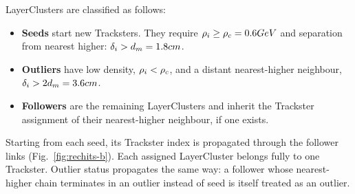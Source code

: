 LayerClusters are classified as follows:
\begin{itemize}
  \item \textbf{Seeds} start new Tracksters. They require
  $\rho_i\geq\rho_{c}=0.6 GeV$ and separation from nearest higher:
  $\delta_i>d_{m}=1.8 cm$.
  \item \textbf{Outliers} have low density, $\rho_i<\rho_{c}$, and a distant
  nearest-higher neighbour, $\delta_i>2d_{m}=3.6 cm$.
  \item \textbf{Followers} are the remaining LayerClusters and inherit the
  Trackster assignment of their nearest-higher neighbour, if one exists.
\end{itemize}

Starting from each seed, its Trackster index is propagated through the
follower links (Fig.~\ref{fig:rechits-b}). Each assigned LayerCluster belongs
fully to one Trackster.
Outlier status propagates the same way: a follower whose nearest-higher chain
terminates in an outlier instead of seed is itself treated as an outlier.
